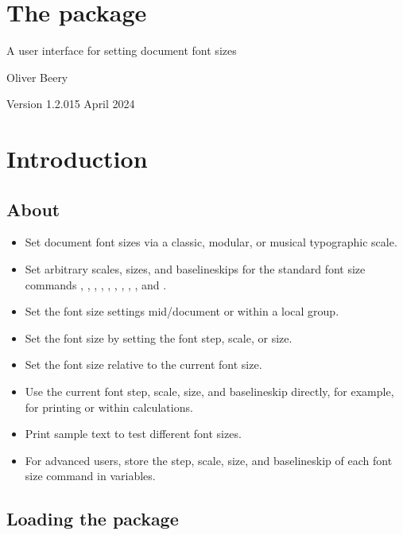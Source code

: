 \documentclass{beery}
\begin{document}
\section*
  {%
    The  package%
  }

A user interface for setting document font sizes

Oliver Beery

Version 1.2.0\quad{}15 April 2024


\section{Introduction}
\label{sec:intro}

\subsection{About}
\label{subsec:about}

\begin{itemize}
  \item
  Set document font sizes via a classic, modular, or musical typographic scale.
  \item
  Set arbitrary scales, sizes, and baselineskips for the standard font size commands , , , , , , , , , and .
  \item
  Set the font size settings mid\-/document or within a local group.
  \item
  Set the font size by setting the font step, scale, or size.
  \item
  Set the font size relative to the current font size.
  \item
  Use the current font step, scale, size, and baselineskip directly, for example, for printing or within calculations.
  \item
  Print sample text to test different font sizes.
  \item
  For advanced users, store the step, scale, size, and baselineskip of each font size command in  variables.
\end{itemize}

\subsection{Loading the package}
\label{subsec:loading}
\end{document}
